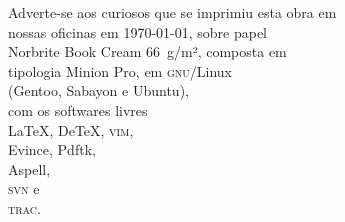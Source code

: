 \pagebreak
\ifodd\thepage\blank\else\relax\fi

\thispagestyle{empty}
\null\vfill

\begin{adjustwidth}{.1\textwidth}{.1\textwidth}
{\noindent\centering\fontsize{10pt}{12pt}\selectfont
Adverte-se aos curiosos que se imprimiu esta obra em\\ nossas oficinas
em \today, sobre papel\\ Norbrite Book Cream 66~g/m²,
composta em\\ tipologia Minion Pro, em \textsc{gnu}/Linux\\
(Gentoo, Sabayon e Ubuntu),\\ com os softwares livres\\
\LaTeX, De\TeX, \textsc{vim},\\ Evince, Pdftk,\\
Aspell,\\ \textsc{svn} e\\ \textsc{trac}.\par}
\end{adjustwidth}


